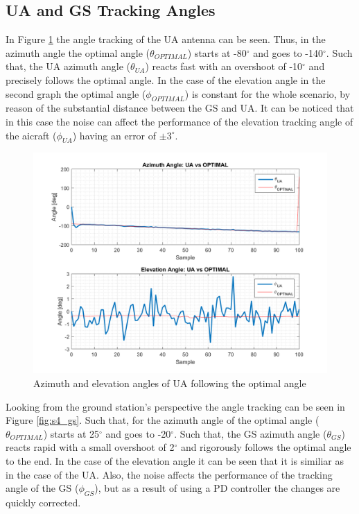 \subsection*{UA and GS Tracking Angles}
In Figure \ref{fig:s4_ua} the angle tracking of the UA antenna can be seen. Thus, in the azimuth angle the optimal angle ($\theta_{OPTIMAL}$) starts at -80$^{\circ}$ and goes to -140$^{\circ}$. Such that, the UA azimuth angle ($\theta_{UA}$) reacts fast with an overshoot of -10$^{\circ}$ and precisely follows the optimal angle. In the case of the elevation angle in the second graph the optimal angle ($\phi_{OPTIMAL}$) is constant for the whole scenario, by reason of the substantial distance between the GS and UA. It can be noticed that in this case the noise can affect the performance of the elevation tracking angle of the aicraft ($\phi_{UA}$) having an error of $\pm3^{\circ}$. 

\begin{figure}[H]
	\centering
	\includegraphics[scale=0.8]{figures/s4_ua.png}
	\caption{Azimuth and elevation angles of UA following the optimal angle}
	\label{fig:s4_ua}
\end{figure}

Looking from the ground station's perspective the angle tracking can be seen in Figure \ref{fig:s4_gs}. Such that, for the azimuth angle of the optimal angle ($\theta_{OPTIMAL}$) starts at 25$^{\circ}$ and goes to -20$^{\circ}$. Such that, the GS azimuth angle ($\theta_{GS}$) reacts rapid with a small overshoot of 2$^{\circ}$ and rigorously follows the optimal angle to the end. In the case of the elevation angle it can be seen that it is similiar as in the case of the UA. Also, the noise affects the performance of the tracking angle of the GS ($\phi_{GS}$), but as a result of using a PD controller the changes are quickly corrected.

